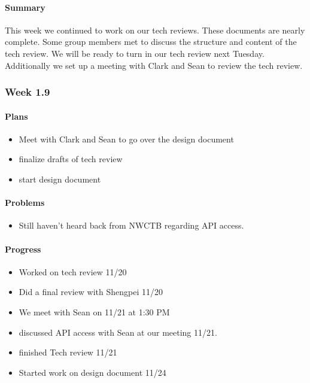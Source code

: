 \documentclass[onecolumn, draftclsnofoot,10pt, compsoc]{article}
\begin{document}
		        \paragraph{Summary}
		             This week we continued to work on our tech reviews. These documents are nearly complete. Some group members met to discuss the structure and content of the tech review. We will be ready to turn in our tech review next Tuesday. Additionally we set up a meeting with Clark and Sean to review the tech review.\\
		    
		\subsubsection{Week 1.9}
		
			\paragraph{Plans} \hfill \break
                \begin{itemize}
                    \item Meet with Clark and Sean to go over the design document
                    \item finalize drafts of tech review
                    \item start design document
                \end{itemize}		
		
		    \paragraph{Problems} \hfill \break
		        \begin{itemize}
		            \item Still haven't heard back from NWCTB regarding API access.
		        \end{itemize}
		
		    \paragraph{Progress} \hfill \break
		        \begin{itemize}
		            \item Worked on tech review 11/20
		            \item Did a final review with Shengpei 11/20
		            \item We meet with Sean on 11/21 at 1:30 PM
		            \item discussed API access with Sean at our meeting 11/21.
		            \item finished Tech review 11/21
		            \item Started work on design document 11/24
		        \end{itemize}
		        
\end{document}
